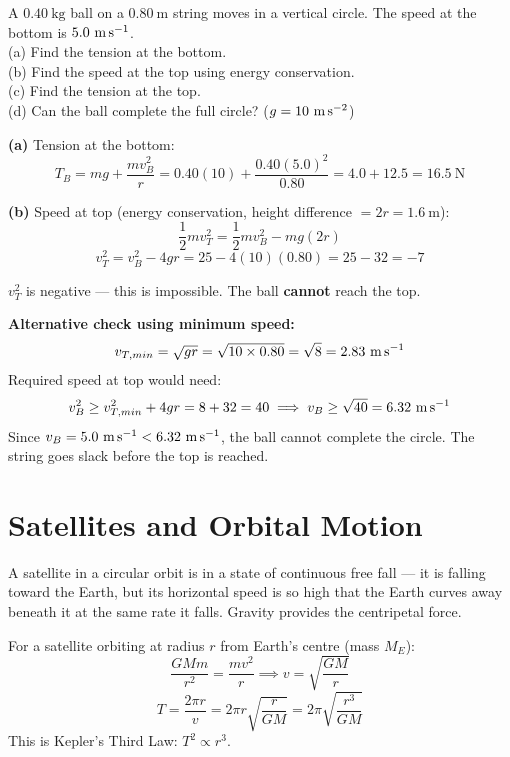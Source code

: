 \begin{examplebox}[6.4]
A $0.40\ \text{kg}$ ball on a $0.80\ \text{m}$ string
moves in a vertical circle. The speed at the bottom
is $5.0\ \text{m\,s}^{-1}$.\\
(a) Find the tension at the bottom.\\
(b) Find the speed at the top using energy conservation.\\
(c) Find the tension at the top.\\
(d) Can the ball complete the full circle?
($g = 10\ \text{m\,s}^{-2}$)
\end{examplebox}

\begin{solutionbox}
\textbf{(a)} Tension at the bottom:
\[
  T_B = mg + \frac{mv_B^2}{r}
  = 0.40(10) + \frac{0.40(5.0)^2}{0.80}
  = 4.0 + 12.5 = 16.5\ \text{N}
\]

\textbf{(b)} Speed at top (energy conservation,
height difference $= 2r = 1.6\ \text{m}$):
\[
  \frac{1}{2}mv_T^2 = \frac{1}{2}mv_B^2 - mg(2r)
\]
\[
  v_T^2 = v_B^2 - 4gr
  = 25 - 4(10)(0.80) = 25 - 32 = -7
\]

$v_T^2$ is negative --- this is impossible.
The ball \textbf{cannot} reach the top.

\textbf{Alternative check using minimum speed:}
\[
  v_{T,min} = \sqrt{gr} = \sqrt{10 \times 0.80}
  = \sqrt{8} = 2.83\ \text{m\,s}^{-1}
\]
Required speed at top would need:
\[
  v_B^2 \geq v_{T,min}^2 + 4gr
  = 8 + 32 = 40
  \implies v_B \geq \sqrt{40} = 6.32\ \text{m\,s}^{-1}
\]
Since $v_B = 5.0\ \text{m\,s}^{-1} < 6.32\ \text{m\,s}^{-1}$,
the ball cannot complete the circle. The string
goes slack before the top is reached.
\end{solutionbox}

\section{Satellites and Orbital Motion}

A satellite in a circular orbit is in a state of
continuous free fall --- it is falling toward the
Earth, but its horizontal speed is so high that the
Earth curves away beneath it at the same rate it
falls. Gravity provides the centripetal force.

\begin{lawbox}
For a satellite orbiting at radius $r$ from Earth's
centre (mass $M_E$):
\[
  \frac{GMm}{r^2} = \frac{mv^2}{r}
  \implies v = \sqrt{\frac{GM}{r}}
\]
\[
  T = \frac{2\pi r}{v} = 2\pi r\sqrt{\frac{r}{GM}}
  = 2\pi\sqrt{\frac{r^3}{GM}}
\]
This is Kepler's Third Law: $T^2 \propto r^3$.
\end{lawbox}

